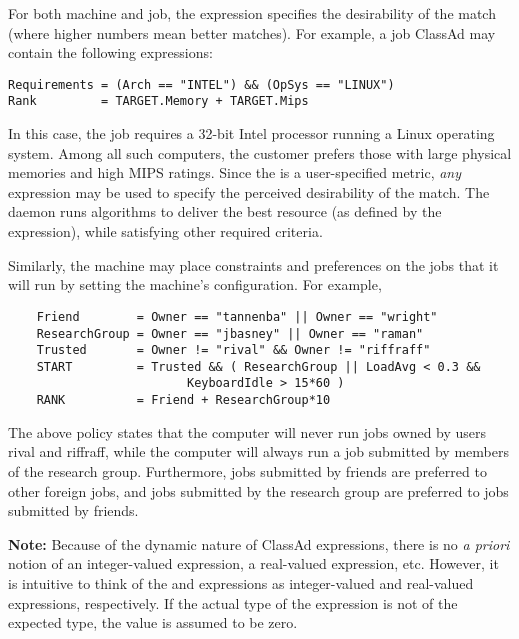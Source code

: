 For both machine and job, 
the  expression specifies
the desirability of the match (where higher numbers mean better matches).
For example, a job ClassAd may contain the following expressions:
\footnotesize
\begin{verbatim}
Requirements = (Arch == "INTEL") && (OpSys == "LINUX")
Rank         = TARGET.Memory + TARGET.Mips
\end{verbatim}
\normalsize
In this case, the job requires a 32-bit Intel processor running a Linux
operating system.
Among all such computers,
the customer prefers those with large physical memories and high MIPS ratings.  
Since the  is a user-specified metric,
\emph{any} expression may be used to specify the
perceived desirability of the match.
The  daemon runs algorithms
to deliver the best resource (as defined by the  expression),
while satisfying other required criteria.

Similarly, the machine may place constraints and preferences on 
the jobs that it will run by setting the machine's configuration.
For example,
\footnotesize
\begin{verbatim}
    Friend        = Owner == "tannenba" || Owner == "wright"
    ResearchGroup = Owner == "jbasney" || Owner == "raman"
    Trusted       = Owner != "rival" && Owner != "riffraff"
    START         = Trusted && ( ResearchGroup || LoadAvg < 0.3 &&
                         KeyboardIdle > 15*60 )
    RANK          = Friend + ResearchGroup*10
\end{verbatim}
\normalsize

The above policy states that the computer will never run jobs owned by
users rival and riffraff, while the computer will always run a 
job submitted by members of the research group.
Furthermore,
jobs submitted by friends are preferred to other foreign jobs,
and jobs submitted
by the research group are preferred to jobs submitted by friends. 

\textbf{Note:}  Because of the dynamic nature of ClassAd expressions, there
is no \emph{a priori} notion of an integer-valued expression, a real-valued
expression, etc.  However, it is intuitive to think of the 
and  expressions as integer-valued and real-valued expressions,
respectively.  If the actual type of the expression is not of the expected 
type, the value is assumed to be zero.


